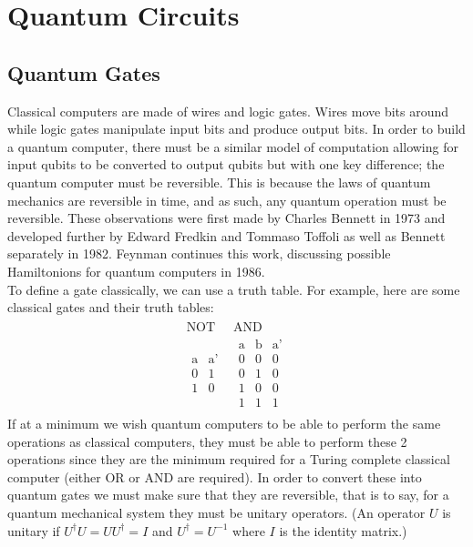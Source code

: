 \documentclass[reqno]{amsart}
\numberwithin{equation}{section}
\numberwithin{figure}{section}
\begin{document}
\section{Quantum Circuits}
\subsection{Quantum Gates}
\begin{justify}
    Classical computers are made of wires and logic gates. Wires move bits around while logic gates manipulate input bits and produce output bits. In order to build a quantum computer, there must be a similar model of computation allowing for input qubits to be converted to output qubits but with one key difference; the quantum computer must be reversible. This is because the laws of quantum mechanics are reversible in time, and as such, any quantum operation must be reversible. These observations were first made by Charles Bennett in 1973 \cite{Bennett1973} and developed further by Edward Fredkin and Tommaso Toffoli as well as Bennett separately in 1982. \cite{FredkinToffoli1982, Bennett1982} Feynman continues this work, discussing possible Hamiltonions for quantum computers in 1986. \cite{Feynman1986} \\

To define a gate classically, we can use a truth table. For example, here are some classical gates and their truth tables:
    \begin{eqnarray}
        \begin{array}{c|c}
            \text{NOT} & \text{AND}\\
            \hline
            \begin{array}{c|c}
                \text{a} & \text{a'} \\
                \hline
                0 & 1 \\
                1 & 0
            \end{array} &
            \begin{array}{cc|c}
                \text{a} & \text{b} & \text{a'} \\
                \hline
                0 & 0 & 0 \\
                0 & 1 & 0 \\
                1 & 0 & 0 \\
                1 & 1 & 1
            \end{array}
        \end{array}
    \end{eqnarray}
    If at a minimum we wish quantum computers to be able to perform the same operations as classical computers, they must be able to perform these 2 operations since they are the minimum required for a Turing complete classical computer (either OR or AND are required). \cite{CopiCohenMcMahon2011} In order to convert these into quantum gates we must make sure that they are reversible, that is to say, for a quantum mechanical system they must be unitary operators. (An operator $U$ is unitary if $U^{\dagger}U = UU^{\dagger} = I$ and $U^{\dagger} = U^{-1}$ where $I$ is the identity matrix.) \\


\end{justify}
\end{document}
